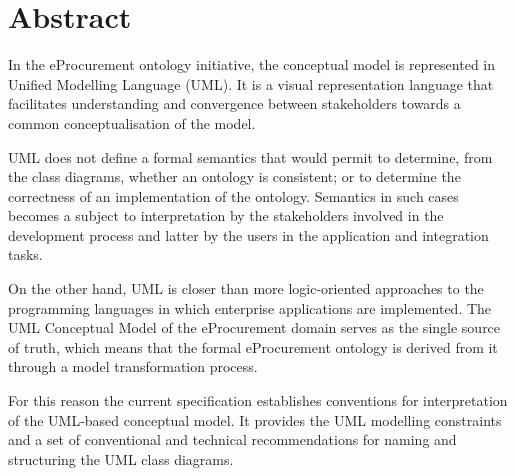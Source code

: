 \section*{Abstract}

	In the eProcurement ontology initiative, the conceptual model is represented in Unified Modelling Language (UML). It is a visual representation language that facilitates understanding and convergence between stakeholders towards a common conceptualisation of the model.
	
	UML does not define a formal semantics that would permit to determine, from the class diagrams, whether an ontology is consistent; or to determine the correctness of an implementation of the ontology. Semantics in such cases becomes a subject to interpretation by the stakeholders involved in the development process and latter by the users in the application and integration tasks.
	
	On the other hand, UML is closer than more logic-oriented approaches to the programming languages in which enterprise applications are implemented. 	The UML Conceptual Model of the eProcurement domain serves as the single source of truth, which means that the formal eProcurement ontology is derived from it through a model transformation process.
	
	For this reason the current specification establishes conventions for interpretation of the UML-based conceptual model. It provides the UML modelling constraints and a set of conventional and technical recommendations for naming and structuring the UML class diagrams.
	
	